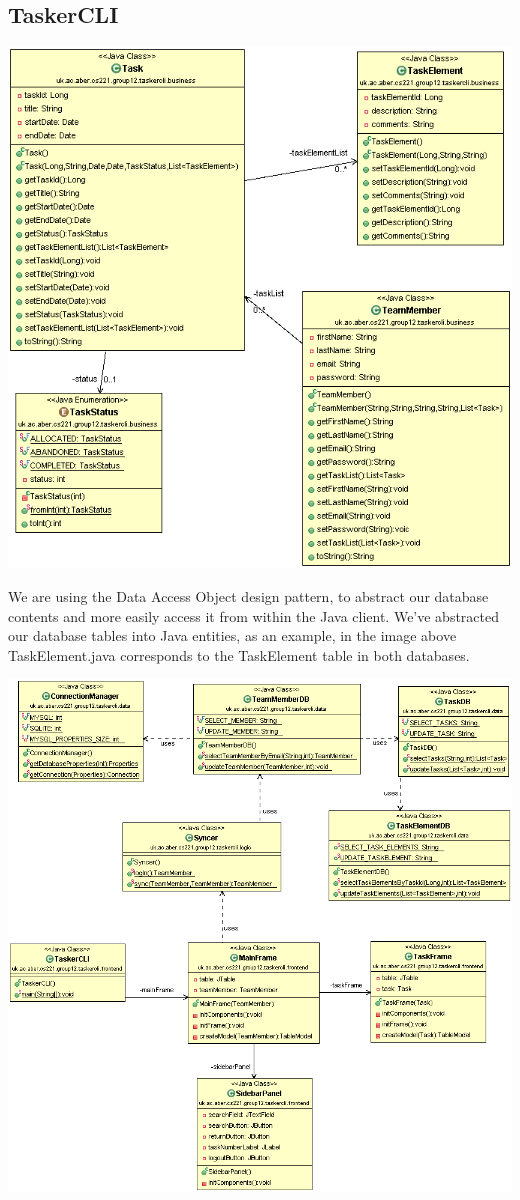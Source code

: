 \subsection{TaskerCLI}
  
  
  \includegraphics{image1.gif}

  We are using the Data Access Object design pattern, to abstract our database contents and more easily access it from within the Java client.
  We've abstracted our database tables into Java entities, as an example, in the image above TaskElement.java corresponds to the TaskElement table in both databases.
  
  
  
  \includegraphics{image2.gif}
  
